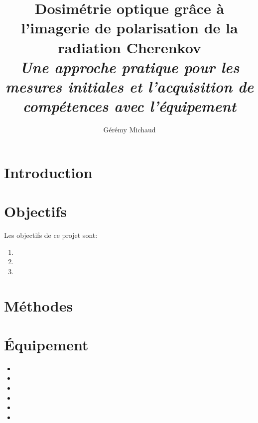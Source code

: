 \documentclass{Thesis}
\title{Dosimétrie optique grâce à l'imagerie de polarisation de la radiation Cherenkov
\\\Large{\textit{Une approche pratique pour les mesures initiales et l'acquisition de compétences avec l'équipement}}}
\author{Gérémy Michaud}{G. Michaud}
\begin{document}
\section*{Introduction}

\section*{Objectifs}
Les objectifs de ce projet sont:
\begin{enumerate}
    \setlength\itemsep{1mm}
    \item 
    \item 
    \item 
\end{enumerate}

\section*{Méthodes}

\section*{Équipement}
\begin{multicols}{2}
\begin{itemize}
    \setlength\itemsep{1mm}
    \item 
    \item 
    \item 
    \item 
    \item 
    \item 
\end{itemize}
\end{multicols}
\end{document}
